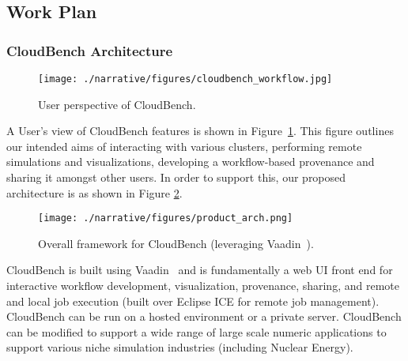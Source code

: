 \begin{enumerate}

\end{enumerate}

\subsection{Work Plan}
\label{sec:workplan}
\subsubsection{CloudBench Architecture}

\begin{figure}[thb]
\begin{center}
\leavevmode
\texttt{[image: ./narrative/figures/cloudbench\_workflow.jpg]}
\end{center}
\caption{User perspective of CloudBench.}
\label{fig:cloudbench_workflow}
\end{figure}

A User's view of CloudBench features is shown in 
Figure~\ref{fig:cloudbench_workflow}. This figure outlines our intended aims of 
interacting with various clusters, performing remote simulations and 
visualizations, developing a workflow-based provenance and sharing it amongst 
other users. In order to support this, our proposed architecture is as shown in 
Figure \ref{fig:arch}.

\begin{figure}[thb]
\begin{center}
\leavevmode
\texttt{[image: ./narrative/figures/product\_arch.png]}
\end{center}
\caption{Overall framework for CloudBench (leveraging Vaadin~\cite{vaadin_client_app}).}
\label{fig:arch}
\end{figure}

CloudBench is built using Vaadin~\cite{vaadin} and is fundamentally a web UI 
front end for interactive workflow development, visualization, provenance,
sharing, and remote and local job execution (built over Eclipse ICE
for remote job management). CloudBench can be run on a hosted
environment or a private server. CloudBench can be modified to support
a wide range of large scale numeric applications to support various
niche simulation industries (including Nuclear Energy).

